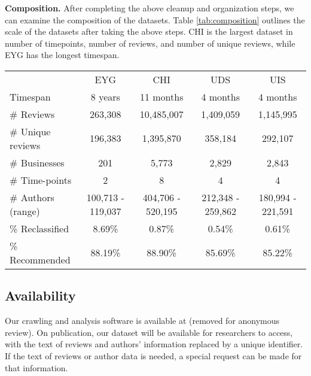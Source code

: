 \textbf{Composition.} After completing the above cleanup and organization steps, we can examine the composition of the datasets. Table \ref{tab:composition} outlines the scale of the datasets after taking the above steps. CHI is the largest dataset in number of timepoints, number of reviews, and number of unique reviews, while EYG has the longest timespan.

\begin{table*}[]
    \centering
    \caption{Composition of the datasets. ``\# reviews'' is the number of reviews collected; each review counts each time it is observed. ``\# unique reviews'' is the number of unique review texts. ``\# businesses'' is the number of businesses for which we observed any reviews. The ``\# authors'' range lower bound assumes all unmatched authors of Not Recommended reviews have a Recommended review in the dataset; the upper bound assumes they do not.
    ``\% Recommended'' is averaged across all time-points. EYG data includes reviews from \citet{mukherjee2013yelp}'s crawl.}
    \label{tab:composition}
        \begin{tabular}{lc|c|c|c}
             & EYG & CHI & UDS & UIS \\
    Timespan & 8 years & 11 months & 4 months & 4 months \\
    \# Reviews & 263,308 & 10,485,007 & 1,409,059 & 1,145,995 \\
    \# Unique reviews & 196,383 & 1,395,870 & 358,184 & 292,107\\
    \# Businesses & 201 & 5,773 & 2,829 & 2,843\\
    \# Time-points & 2 & 8 & 4 & 4 \\
    \# Authors (range)  & 100,713 - 119,037 & 404,706 - 520,195 & 212,348 - 259,862 & 180,994 - 221,591\\
    \% Reclassified & 8.69\% & 0.87\% & 0.54\% &  0.61\%\\
    \% Recommended & 88.19\% & 88.90\% & 85.69\% & 85.22\% \\
        \end{tabular}
\end{table*}

\subsection{Availability}
Our crawling and analysis software is available at (removed for anonymous review). On publication, our dataset will be available for researchers to access, with the text of reviews and authors' information replaced by a unique identifier. If the text of reviews or author data is needed, a special request can be made for that information.
